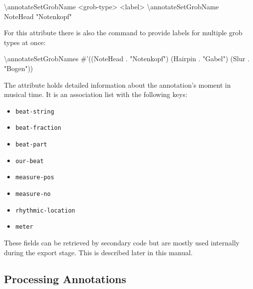 \documentclass[]{ollmanual}
\newenvironment{Shaded}{}{}
\newcommand{\DataTypeTok}[1]{\textcolor[rgb]{0.56,0.13,0.00}{#1}}
\newcommand{\FloatTok}[1]{\textcolor[rgb]{0.25,0.63,0.44}{#1}}
\newcommand{\FunctionTok}[1]{\textcolor[rgb]{0.02,0.16,0.49}{#1}}
\newcommand{\NormalTok}[1]{#1}
\newcommand{\StringTok}[1]{\textcolor[rgb]{0.25,0.44,0.63}{#1}}
\providecommand{\tightlist}{%
  \setlength{\itemsep}{0pt}\setlength{\parskip}{0pt}}
\begin{document}
\begin{Shaded}
\begin{Highlighting}[]
\FunctionTok{\textbackslash{}annotateSetGrobName} \DataTypeTok{<}\NormalTok{grob-type> }\DataTypeTok{<}\NormalTok{label>}
\FunctionTok{\textbackslash{}annotateSetGrobName}\NormalTok{ NoteHead "}\StringTok{Notenkopf"}
\end{Highlighting}
\end{Shaded}

For this attribute there is also the command 
to provide labels for multiple grob types at once:

\begin{Shaded}
\begin{Highlighting}[]
\FunctionTok{\textbackslash{}annotateSetGrobNames}
\NormalTok{#}\FloatTok{'((NoteHead . "}\StringTok{Notenkopf"}\FloatTok{)}
\FloatTok{   (Hairpin . "}\StringTok{Gabel"}\FloatTok{)}
\FloatTok{   (Slur . "}\StringTok{Bogen"}\FloatTok{))}
\end{Highlighting}
\end{Shaded}


The  attribute holds detailed information about
the annotation's moment in musical time. It is an association list with
the following keys:

\begin{itemize}
\tightlist
\item
  \texttt{beat-string}
\item
  \texttt{beat-fraction}
\item
  \texttt{beat-part}
\item
  \texttt{our-beat}
\item
  \texttt{measure-pos}
\item
  \texttt{measure-no}
\item
  \texttt{rhythmic-location}
\item
  \texttt{meter}
\end{itemize}

These fields can be retrieved by secondary code but are mostly used
internally during the export stage. This is described later in this
manual.

\hypertarget{processing-annotations}{%
\subsection{Processing Annotations}\label{processing-annotations}}
\end{document}
